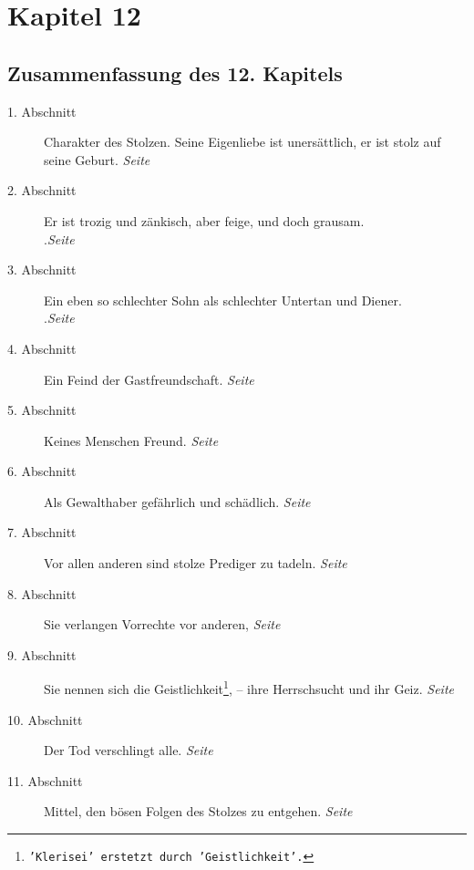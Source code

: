 
\chapter{Kapitel 12} \label{kap12}

\section{Zusammenfassung des 12. Kapitels}

\begin{description}
\item[1. Abschnitt] Charakter des Stolzen. Seine Eigenliebe ist unersättlich,
er
ist stolz auf seine Geburt.
\dotfill \textit{Seite~\pageref{kap12_ab1}}\\
\item[2. Abschnitt] Er ist trozig und zänkisch, aber feige, und doch grausam.\\
.\dotfill \textit{Seite~\pageref{kap12_ab2}}\\
\item[3. Abschnitt] Ein eben so schlechter Sohn als schlechter Untertan und
Diener.\\
.\dotfill \textit{Seite~\pageref{kap12_ab3}}\\
\item[4. Abschnitt] Ein Feind der Gastfreundschaft.
\dotfill \textit{Seite~\pageref{kap12_ab4}}\\
\item[5. Abschnitt] Keines Menschen Freund.
\dotfill \textit{Seite~\pageref{kap12_ab5}}\\
\item[6. Abschnitt] Als Gewalthaber gefährlich und schädlich.
\dotfill \textit{Seite~\pageref{kap12_ab6}}\\
\item[7. Abschnitt] Vor allen anderen sind stolze Prediger zu tadeln.
\dotfill \textit{Seite~\pageref{kap12_ab7}}\\
\item[8. Abschnitt] Sie verlangen Vorrechte vor anderen,
\dotfill \textit{Seite~\pageref{kap12_ab8}}\\
\item[9. Abschnitt] Sie nennen sich die
Geistlichkeit\footnote{\texttt{'Klerisei' erstetzt durch 'Geistlichkeit'.}}, --
ihre Herrschsucht und ihr Geiz.
\dotfill \textit{Seite~\pageref{kap12_ab9}}\\
\item[10. Abschnitt] Der Tod verschlingt alle.
\dotfill \textit{Seite~\pageref{kap12_ab10}}\\
\item[11. Abschnitt] Mittel, den bösen Folgen des Stolzes zu entgehen.
\dotfill \textit{Seite~\pageref{kap12_ab11}}\\
\end{description}

